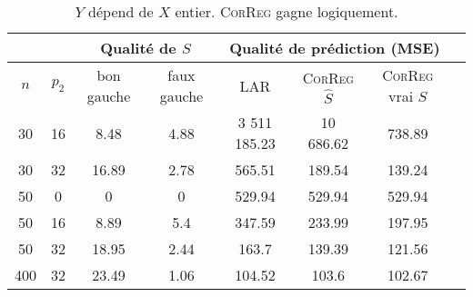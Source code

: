\documentclass[12pt]{article}
\begin{document}

\begin{table}
\centering
\begin{tabular}{|c|c|c|c|c|c|c|c|}
\cline{3-7}
 \multicolumn{2}{c|}{}  & \multicolumn{2}{c|}{Qualité de $S$} & \multicolumn{3}{c|}{Qualité de prédiction (MSE)} \\
\hline 
$n$ & $p_2$ & bon gauche & faux gauche    & LAR  &    \textsc{CorReg} $\hat S$& \textsc{CorReg} vrai $S$\\ 
\hline 
30 & 16 & 8.48 & 4.88 & 3 511 185.23 & 10 686.62 & 738.89 \\ 
\hline 
30 & 32 & 16.89 & 2.78 & 565.51 & 189.54 & 139.24\\ 
\hline 
\hline 
50 & 0 & 0 & 0 & 529.94 & 529.94 & 529.94 \\ 
\hline 
50 & 16 & 8.89 & 5.4 & 347.59 & 233.99 & 197.95\\ 
\hline 
50 & 32 & 18.95 & 2.44 & 163.7 & 139.39 & 121.56 \\ 
\hline \hline
400 & 32 & 23.49 & 1.06 & 104.52 & 103.6 & 102.67\\ 
\hline 
\end{tabular} 
\caption{$Y$  dépend  de $X$ entier. \textsc{CorReg} gagne logiquement.} \label{tableMSEsimtout}
\end{table}
\end{document}
